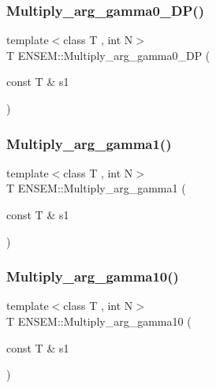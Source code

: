 \mbox{\label{namespaceENSEM_a728cdffad1181ba8d9631643b0240571}} 
\subsubsection{\texorpdfstring{Multiply\_arg\_gamma0\_DP()}{Multiply\_arg\_gamma0\_DP()}}
{\footnotesize\ttfamily template$<$class T , int N$>$ \\
T E\+N\+S\+E\+M\+::\+Multiply\+\_\+arg\+\_\+gamma0\+\_\+\+DP (\begin{DoxyParamCaption}\item[{const T \&}]{s1 }\end{DoxyParamCaption})\hspace{0.3cm}{\ttfamily [inline]}}

\mbox{\label{namespaceENSEM_a60ccb9e2fa020c162e6bb275d0f3571b}} 
\subsubsection{\texorpdfstring{Multiply\_arg\_gamma1()}{Multiply\_arg\_gamma1()}}
{\footnotesize\ttfamily template$<$class T , int N$>$ \\
T E\+N\+S\+E\+M\+::\+Multiply\+\_\+arg\+\_\+gamma1 (\begin{DoxyParamCaption}\item[{const T \&}]{s1 }\end{DoxyParamCaption})\hspace{0.3cm}{\ttfamily [inline]}}

\mbox{\label{namespaceENSEM_adca6a0195009141b0fff947a5beae7a5}} 
\subsubsection{\texorpdfstring{Multiply\_arg\_gamma10()}{Multiply\_arg\_gamma10()}}
{\footnotesize\ttfamily template$<$class T , int N$>$ \\
T E\+N\+S\+E\+M\+::\+Multiply\+\_\+arg\+\_\+gamma10 (\begin{DoxyParamCaption}\item[{const T \&}]{s1 }\end{DoxyParamCaption})\hspace{0.3cm}{\ttfamily [inline]}}

